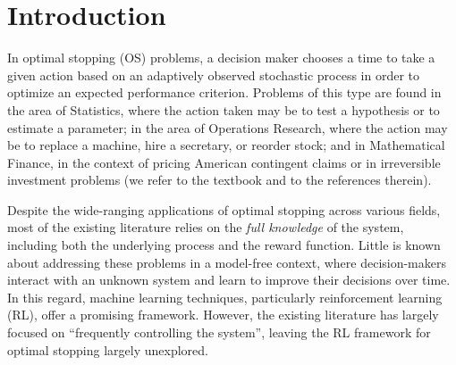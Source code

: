 \documentclass[11pt]{amsart}
\theoremstyle{plain}
\numberwithin{equation}{section}
\begin{document}
\section{Introduction} 
In optimal stopping (OS) problems, a decision maker chooses a time to
take a given action based on an adaptively observed stochastic process in order to optimize an expected performance criterion. Problems of this type are found in the area of Statistics, where the action taken may be to test a hypothesis or to estimate a parameter; in the area of Operations Research, where the action may be to replace a machine, hire a secretary, or reorder stock; and in Mathematical Finance, 
in the context of pricing American contingent claims or in irreversible investment problems
(we refer to the textbook \cite{peskir.shiryav.2006optimal} and to the references therein).

Despite the wide-ranging applications of optimal stopping across various fields, most of the existing literature relies on the {\it full knowledge} of the system, including both the underlying process and the reward function. Little is known about addressing these problems in a model-free context, where decision-makers interact with an unknown system and learn to improve their decisions over time. In this regard, machine learning techniques, particularly reinforcement learning (RL), offer a promising framework. However, the existing literature has largely focused on ``frequently controlling the system'', leaving the RL framework for optimal stopping largely unexplored.
\end{document}
